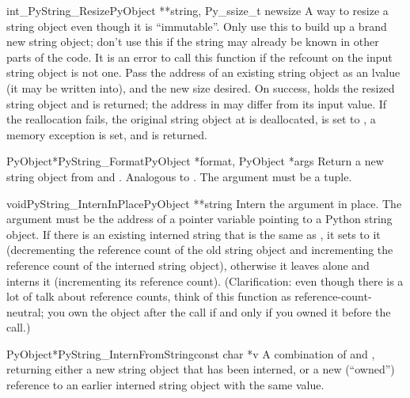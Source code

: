 \begin{cfuncdesc}{int}{_PyString_Resize}{PyObject **string, Py_ssize_t newsize}
  A way to resize a string object even though it is ``immutable''.
  Only use this to build up a brand new string object; don't use this
  if the string may already be known in other parts of the code.  It
  is an error to call this function if the refcount on the input string
  object is not one.
  Pass the address of an existing string object as an lvalue (it may
  be written into), and the new size desired.  On success, 
  holds the resized string object and  is returned; the address in
   may differ from its input value.  If the
  reallocation fails, the original string object at  is
  deallocated,  is set to \NULL{}, a memory exception is set,
  and  is returned.
\end{cfuncdesc}

\begin{cfuncdesc}{PyObject*}{PyString_Format}{PyObject *format,
                                              PyObject *args}
  Return a new string object from  and .
  Analogous to .  The 
  argument must be a tuple.
\end{cfuncdesc}

\begin{cfuncdesc}{void}{PyString_InternInPlace}{PyObject **string}
  Intern the argument  in place.  The argument must be
  the address of a pointer variable pointing to a Python string
  object.  If there is an existing interned string that is the same as
  , it sets  to it (decrementing the
  reference count of the old string object and incrementing the
  reference count of the interned string object), otherwise it leaves
   alone and interns it (incrementing its reference
  count).  (Clarification: even though there is a lot of talk about
  reference counts, think of this function as reference-count-neutral;
  you own the object after the call if and only if you owned it before
  the call.)
\end{cfuncdesc}

\begin{cfuncdesc}{PyObject*}{PyString_InternFromString}{const char *v}
  A combination of  and
  , returning either a new string
  object that has been interned, or a new (``owned'') reference to an
  earlier interned string object with the same value.
\end{cfuncdesc}

